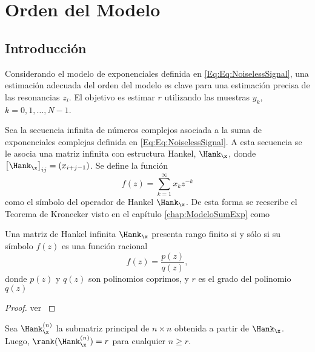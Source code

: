 \chapter{Orden del Modelo}\label{chap:OrdenModelo}


	\section{Introducción}
 	Considerando el modelo de exponenciales definida en \eqref{Eq:Eq:NoiselessSignal}, una estimación adecuada del orden del modelo es clave para una estimación precisa de las resonancias $z_i$. El objetivo es estimar $r$ utilizando las muestras $y_k$, $k = 0,1,\ldots,N-1$.

	Sea la secuencia infinita de números complejos asociada a la suma de exponenciales complejas definida en \eqref{Eq:Eq:NoiselessSignal}. A esta secuencia se le asocia una matriz infinita con estructura Hankel, $\Hank_{\x}$, donde $\big[\Hank_{\x}\big]_{ij} = (x_{i+j-1})$. Se define la función
	\begin{equation}
		f(z) = \sum_{k=1}^\infty x_k z^{-k}
		\label{Eq:SymbolHankel}
	\end{equation}
	como el símbolo del operador de Hankel $\Hank_{\x}$. De esta forma se reescribe el Teorema de Kronecker visto en el capítulo \eqref{chap:ModeloSumExp} como

	\begin{theorem}\label{Th:Kronecker2}
		Una matriz de Hankel infinita $\Hank_{\x}$ presenta rango finito si y sólo si su símbolo $f(z)$ es una función racional
		\begin{equation}
			f(z) = \frac{p(z)}{q(z)},
			\label{Eq:RationalFunction}
		\end{equation}
		donde $p(z)$ y $q(z)$ son polinomios coprimos, y $r$ es el grado del polinomio $q(z)$
	\end{theorem}
	\begin{proof}
		ver \cite{Fuhrmann2011}
	\end{proof}
	Sea $\Hank_{\x}^{(n)}$ la submatriz principal de $n\times n$ obtenida a partir de $\Hank_{\x}$. Luego, $\rank(\Hank_{\x}^{(n)}) = r$ para cualquier $n\geq r$.

